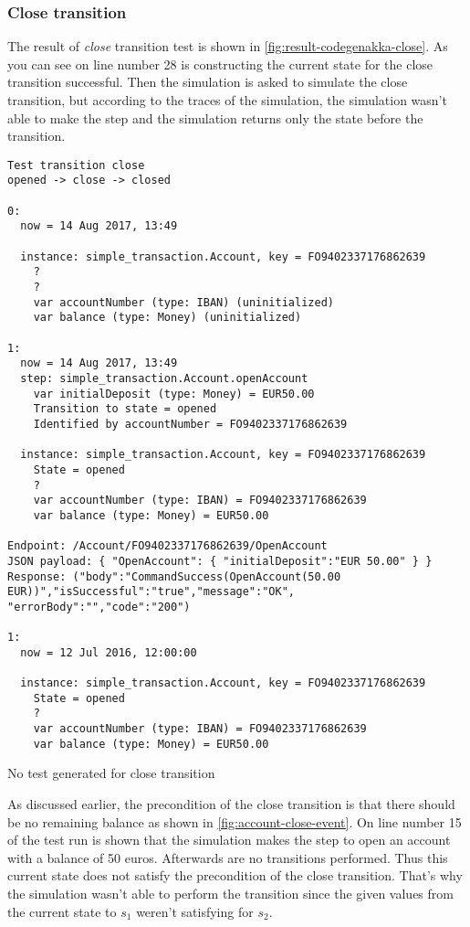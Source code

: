 \subsubsection{Close transition}
\label{sec:close-no-test-codegenakka}

The result of \textit{close} transition test is shown in
\autoref{fig:result-codegenakka-close}. As you can see on line number 28 is
constructing the current state for the close transition successful. Then the
simulation is asked to simulate the close transition, but according to the
traces of the simulation, the simulation wasn't able to make the step and the
simulation returns only the state before the transition.

\begin{sourcecode}[h!]
\begin{lstlisting}[]
Test transition close
opened -> close -> closed

0:
  now = 14 Aug 2017, 13:49

  instance: simple_transaction.Account, key = FO9402337176862639
    ?
    ?
    var accountNumber (type: IBAN) (uninitialized)
    var balance (type: Money) (uninitialized)

1:
  now = 14 Aug 2017, 13:49
  step: simple_transaction.Account.openAccount
    var initialDeposit (type: Money) = EUR50.00
    Transition to state = opened
    Identified by accountNumber = FO9402337176862639

  instance: simple_transaction.Account, key = FO9402337176862639
    State = opened
    ?
    var accountNumber (type: IBAN) = FO9402337176862639
    var balance (type: Money) = EUR50.00

Endpoint: /Account/FO9402337176862639/OpenAccount
JSON payload: { "OpenAccount": { "initialDeposit":"EUR 50.00" } }
Response: ("body":"CommandSuccess(OpenAccount(50.00 EUR))","isSuccessful":"true","message":"OK",
"errorBody":"","code":"200")

1:
  now = 12 Jul 2016, 12:00:00

  instance: simple_transaction.Account, key = FO9402337176862639
    State = opened
    ?
    var accountNumber (type: IBAN) = FO9402337176862639
    var balance (type: Money) = EUR50.00
\end{lstlisting}
\caption{No test generated for close transition}
\label{fig:result-codegenakka-close}
\end{sourcecode}

As discussed earlier, the precondition of the close transition is that there
should be no remaining balance as shown in \autoref{fig:account-close-event}.
On line number 15 of the test run is shown that the simulation makes the step to
open an account with a balance of 50 euros. Afterwards are no transitions
performed. Thus this current state does not satisfy the precondition of the
close transition. That's why the simulation wasn't able to perform the
transition since the given values from the current state to $s_{1}$ weren't
satisfying for $s_{2}$.

